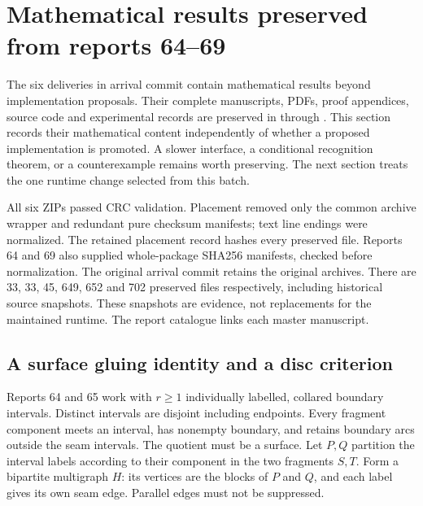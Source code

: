 \section{Mathematical results preserved from reports 64--69}
\label{sec:completion-theorems}

The six deliveries in arrival commit  contain mathematical
results beyond implementation proposals. Their complete manuscripts, PDFs,
proof appendices, source code and experimental records are preserved in
 through . This section records their
mathematical content independently of whether a proposed implementation is
promoted. A slower interface, a conditional recognition theorem, or a
counterexample remains worth preserving. The next section treats the one
runtime change selected from this batch.

All six ZIPs passed CRC validation. Placement removed only the common archive
wrapper and redundant pure checksum manifests; text line endings were
normalized. The retained placement record hashes every preserved file.
Reports 64 and 69 also supplied whole-package SHA256 manifests, checked before
normalization. The original arrival commit retains the original archives.
There are 33, 33, 45, 649, 652 and 702 preserved files respectively, including
historical source snapshots. These snapshots are evidence, not replacements
for the maintained runtime. The report catalogue links each master manuscript.

\subsection{A surface gluing identity and a disc criterion}

Reports 64 and 65 work with $r\ge1$ individually labelled, collared boundary
intervals. Distinct intervals are disjoint including endpoints. Every
fragment component meets an interval, has nonempty boundary, and retains
boundary arcs outside the seam intervals. The quotient must be a surface.
Let $P,Q$ partition the interval labels according to their component in the
two fragments $S,T$. Form a bipartite multigraph $H$: its vertices are the
blocks of $P$ and $Q$, and each label gives its own seam edge. Parallel edges
must not be suppressed.

